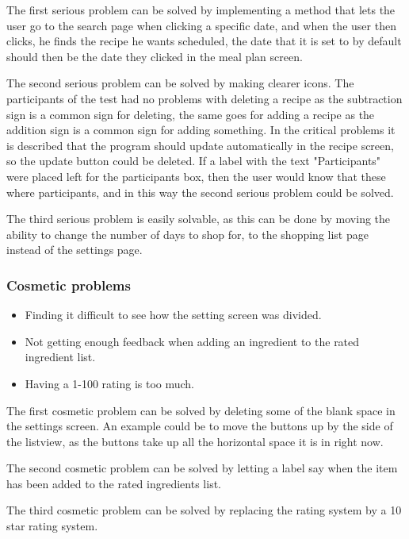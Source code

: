 The first serious problem can be solved by implementing a method that lets the user go to the search page when clicking a specific date, and when the user then clicks, he finds the recipe he wants scheduled, the date that it is set to by default should then be the date they clicked in the meal plan screen.

The second serious problem can be solved by making clearer icons. The participants of the test had no problems with deleting a recipe as the subtraction sign is a common sign for deleting, the same goes for adding a recipe as the addition sign is a common sign for adding something. In the critical problems it is described that the program should update automatically in the recipe screen, so the update button could be deleted. If a label with the text "Participants" were placed left for the participants box, then the user would know that these where participants, and in this way the second serious problem could be solved.

The third serious problem is easily solvable, as this can be done by moving the ability to change the number of days to shop for, to the shopping list page instead of the settings page.

\subsubsection{Cosmetic problems}

\begin{itemize}
    \item Finding it difficult to see how the setting screen was divided.
    \item Not getting enough feedback when adding an ingredient to the rated ingredient list.
    \item Having a 1-100 rating is too much.
\end{itemize}

The first cosmetic problem can be solved by deleting some of the blank space in the settings screen. An example could be to move the buttons up by the side of the listview, as the buttons take up all the horizontal space it is in right now.

The second cosmetic problem can be solved by letting a label say when the item has been added to the rated ingredients list.

The third cosmetic problem can be solved by replacing the rating system by a 10 star rating system.